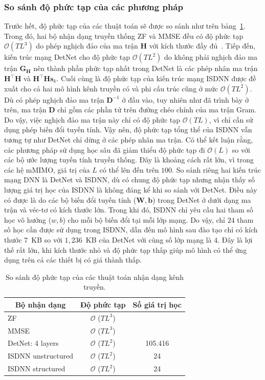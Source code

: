 \subsubsection{So sánh độ phức tạp của các phương pháp}
Trước hết, độ phức tạp của các thuật toán sẽ được so sánh như trên bảng~\ref{tab:computational}. Trong đó, hai bộ nhận dạng truyền thống ZF và MMSE đều có độ phức tạp $\mathcal{O}(TL^3)$ do phép nghịch đảo của ma trận $\mathbf{H}$ với kích thước đầy đủ~\cite{Victor1992}. Tiếp đến, kiến trúc mạng DetNet cho độ phức tạp $\mathcal{O}(TL^2)$ do không phải nghịch đảo ma trận $\mathbf{G}_\mathbf{H}$ nên thành phần phức tạp nhất trong DetNet là các phép nhân ma trận $\mathbf{H}^\top \mathbf{H}$ và $\mathbf{H}^\top \mathbf{H} \mathbf{s}_k$. Cuối cùng là độ phức tạp của kiến trúc mạng ISDNN được đề xuất cho cả hai mô hình kênh truyền có và phi cấu trúc cũng ở mức $\mathcal{O}(TL^2)$. Dù có phép nghịch đảo ma trận $\mathbf{D}^{-1}$ ở đầu vào, tuy nhiên như đã trình bày ở trên, ma trận $\mathbf{D}$ chỉ gồm các phần tử trên đường chéo chính của ma trận Gram. Do vậy, việc nghịch đảo ma trận này chỉ có độ phức tạp $\mathcal{O}(TL)$, vì chỉ cần sử dụng phép biến đổi tuyến tính. Vậy nên, độ phức tạp tổng thể của ISDNN vẫn tương tự như DetNet chỉ dừng ở các phép nhân ma trận. Có thể kết luận rằng, các phương pháp sử dụng học sâu đã giảm thiểu độ phức tạp đi $\mathcal{O}(L)$ so với các bộ ước lượng tuyến tính truyền thống. Đây là khoảng cách rất lớn, vì trong các hệ mMIMO, giá trị của $L$ có thể lên đến trên $100$. So sánh riêng hai kiến trúc mạng DNN là DetNet và ISDNN, dù có chung độ phức tạp nhưng nhận thấy số lượng giá trị học của ISDNN là không đáng kể khi so sánh với DetNet. Điều này có được là do các bộ biến đổi tuyến tính ($\mathbf{W}, \mathbf{b}$) trong DetNet ở dưới dạng ma trận và véc-tơ có kích thước lớn. Trong khi đó, ISDNN chỉ yêu cầu hai tham số học vô hướng ($w, b$) cho mỗi bộ biến đổi tại mỗi lớp mạng. Do vậy, chỉ $24$ tham số học cần được sử dụng trong ISDNN, dẫn đến mô hình sau đào tạo chỉ có kích thước $7$~KB so với $1,236$~KB của DetNet với cùng số lớp mạng là $4$. Đây là lợi thế rất lớn, khi kích thước nhỏ và độ phức tạp thấp giúp mô hình có thể ứng dụng trên cả các thiết bị có giá thành thấp.
\begin{table}[ht]
    \centering
    \caption{So sánh độ phức tạp của các thuật toán nhận dạng kênh truyền.}
    \label{tab:computational}
    \begin{tabular}{l|c|c}
    \hline
    \hline
    \multicolumn{1}{c|}{\textbf{Bộ nhận dạng}} & \textbf{Độ phức tạp} & \textbf{Số giá trị học} \\ \hline
    ZF & $\mathcal{O}$ ($TL^3$) &  \\ \hline
    MMSE & $\mathcal{O}$ ($TL^3$) &  \\ \hline
    DetNet: 4 layers~\cite{Samuel2019} & $\mathcal{O}$ ($TL^2$) & 105.416 \\ \hline
    ISDNN unstructured& $\mathcal{O}$ ($TL^2$) & 24 \\ \hline
    ISDNN structured& $\mathcal{O}$ ($TL^2$) & 24 \\ \hline
    \end{tabular}
\end{table}

